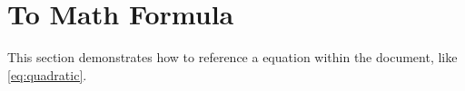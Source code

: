 \section{To Math Formula}
\label{sec:to_math_formula} %

This section demonstrates how to reference a equation within the document, like \cref{eq:quadratic}.
